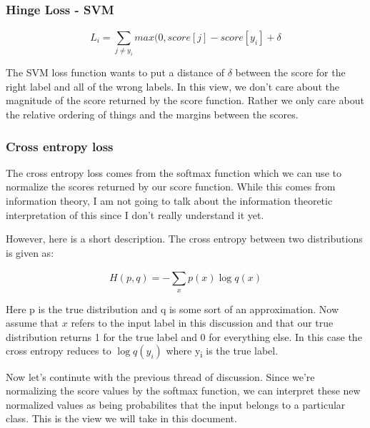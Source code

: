 \documentclass[11pt]{article}
\begin{document}
\subsubsection{Hinge Loss - SVM}
\label{sec:org238305d}

\begin{equation}

L_i = \sum_{ j \neq y_i} ^ {} max (0, score[j] - score [y_i] + \delta 

\end{equation}

The SVM loss function wants to put a distance of \(\delta\) between the score for the right label and 
all of the wrong labels. In this view, we don't care about the magnitude of the score returned by the score
function. Rather we only care about the relative ordering of things and the margins between the scores. 

\subsubsection{Cross entropy loss}
\label{sec:org0834da1}

The cross entropy loss comes from the softmax function which we can use to normalize the scores returned
by our score function. While this comes from information theory, I am not going to talk about the information 
theoretic interpretation of this since I don't really understand it yet. 

However, here is a short description. The cross entropy between two distributions is given as: 

\begin{equation}

H(p,q) = - \sum_{x}^{} p(x) \log {q(x)}

\end{equation}

Here p is the true distribution and q is some sort of an approximation. Now assume that \(x\) refers to the 
input label in this discussion and that our true distribution returns 1 for the true label and 0 for everything else. 
In this case the cross entropy reduces to \(\log{q(y_i)}\) where y\textsubscript{i} is the true label.  

Now let's continute with the previous thread of discussion. Since we're normalizing the score values by the softmax function, we 
can interpret these new normalized values as being probabilites that the input belongs to a particular class. This 
is the view we will take in this document. 
\end{document}
